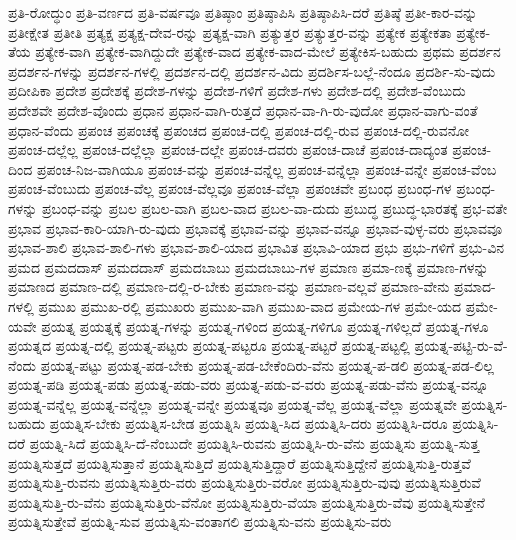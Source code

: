 {ಪ್ರತಿ-ರೋದ್ಧುಂ
ಪ್ರತಿ-ವರ್ಣದ
ಪ್ರತಿ-ವರ್ಷವೂ
ಪ್ರತಿಷ್ಠಾಂ
ಪ್ರತಿಷ್ಠಾಪಿಸಿ
ಪ್ರತಿಷ್ಠಾಪಿಸಿ-ದರೆ
ಪ್ರತಿಷ್ಠೆ
ಪ್ರತೀ-ಕಾರ-ವನ್ನು
ಪ್ರತೀಕ್ಷೇತ
ಪ್ರತೀತಿ
ಪ್ರತ್ಯಕ್ಷ
ಪ್ರತ್ಯಕ್ಷ-ದೇವ-ರನ್ನು
ಪ್ರತ್ಯಕ್ಷ-ವಾಗಿ
ಪ್ರತ್ಯುತ್ತರ
ಪ್ರತ್ಯುತ್ತರ-ವನ್ನು
ಪ್ರತ್ಯೇಕ
ಪ್ರತ್ಯೇಕತಾ
ಪ್ರತ್ಯೇಕ-ತೆಯ
ಪ್ರತ್ಯೇಕ-ವಾಗಿ
ಪ್ರತ್ಯೇಕ-ವಾಗಿದ್ದುದೇ
ಪ್ರತ್ಯೇಕ-ವಾದ
ಪ್ರತ್ಯೇಕ-ವಾದ-ಮೇಲೆ
ಪ್ರತ್ಯೇಕಿಸ-ಬಹುದು
ಪ್ರಥಮ
ಪ್ರದರ್ಶನ
ಪ್ರದರ್ಶನ-ಗಳನ್ನು
ಪ್ರದರ್ಶನ-ಗಳಲ್ಲಿ
ಪ್ರದರ್ಶನ-ದಲ್ಲಿ
ಪ್ರದರ್ಶನ-ವಿದು
ಪ್ರದರ್ಶಿಸ-ಬಲ್ಲೆ-ನೆಂದೂ
ಪ್ರದರ್ಶಿ-ಸು-ವುದು
ಪ್ರದೀಪಿಕಾ
ಪ್ರದೇಶ
ಪ್ರದೇಶಕ್ಕೆ
ಪ್ರದೇಶ-ಗಳನ್ನು
ಪ್ರದೇಶ-ಗಳಿಗೆ
ಪ್ರದೇಶ-ಗಳು
ಪ್ರದೇಶ-ದಲ್ಲಿ
ಪ್ರದೇಶ-ವೆಂಬುದು
ಪ್ರದೇಶವೇ
ಪ್ರದೇಶ-ವೊಂದು
ಪ್ರಧಾನ
ಪ್ರಧಾನ-ವಾಗಿ-ರುತ್ತದೆ
ಪ್ರಧಾನ-ವಾ-ಗಿ-ರು-ವುದೋ
ಪ್ರಧಾನ-ವಾಗು-ವಂತೆ
ಪ್ರಧಾನ-ವೆಂದು
ಪ್ರಪಂಚ
ಪ್ರಪಂಚಕ್ಕೆ
ಪ್ರಪಂಚದ
ಪ್ರಪಂಚ-ದಲ್ಲಿ
ಪ್ರಪಂಚ-ದಲ್ಲಿ-ರುವ
ಪ್ರಪಂಚ-ದಲ್ಲಿ-ರುವನೋ
ಪ್ರಪಂಚ-ದಲ್ಲೆಲ್ಲ
ಪ್ರಪಂಚ-ದಲ್ಲೆಲ್ಲಾ
ಪ್ರಪಂಚ-ದಲ್ಲೇ
ಪ್ರಪಂಚ-ದವರು
ಪ್ರಪಂಚ-ದಾಚೆ
ಪ್ರಪಂಚ-ದಾದ್ಯಂತ
ಪ್ರಪಂಚ-ದಿಂದ
ಪ್ರಪಂಚ-ನಿಜ-ವಾಗಿಯೂ
ಪ್ರಪಂಚ-ವನ್ನು
ಪ್ರಪಂಚ-ವನ್ನೆಲ್ಲ
ಪ್ರಪಂಚ-ವನ್ನೆಲ್ಲಾ
ಪ್ರಪಂಚ-ವನ್ನೇ
ಪ್ರಪಂಚ-ವೆಂಬ
ಪ್ರಪಂಚ-ವೆಂಬುದು
ಪ್ರಪಂಚ-ವೆಲ್ಲ
ಪ್ರಪಂಚ-ವೆಲ್ಲವೂ
ಪ್ರಪಂಚ-ವೆಲ್ಲಾ
ಪ್ರಪಂಚವೇ
ಪ್ರಬಂಧ
ಪ್ರಬಂಧ-ಗಳ
ಪ್ರಬಂಧ-ಗಳನ್ನು
ಪ್ರಬಂಧ-ವನ್ನು
ಪ್ರಬಲ
ಪ್ರಬಲ-ವಾಗಿ
ಪ್ರಬಲ-ವಾದ
ಪ್ರಬಲ-ವಾ-ದುದು
ಪ್ರಬುದ್ಧ
ಪ್ರಬುದ್ಧ-ಭಾರತಕ್ಕೆ
ಪ್ರಭ-ವತೇ
ಪ್ರಭಾವ
ಪ್ರಭಾವ-ಕಾರಿ-ಯಾಗಿ-ರು-ವುದು
ಪ್ರಭಾವಕ್ಕೆ
ಪ್ರಭಾವ-ವನ್ನು
ಪ್ರಭಾವ-ವನ್ನೂ
ಪ್ರಭಾವ-ವುಳ್ಳ-ವರು
ಪ್ರಭಾವವೂ
ಪ್ರಭಾವ-ಶಾಲಿ
ಪ್ರಭಾವ-ಶಾಲಿ-ಗಳು
ಪ್ರಭಾವ-ಶಾಲಿ-ಯಾದ
ಪ್ರಭಾವಿತ
ಪ್ರಭಾವಿ-ಯಾದ
ಪ್ರಭು
ಪ್ರಭು-ಗಳಿಗೆ
ಪ್ರಭು-ವಿನ
ಪ್ರಮದ
ಪ್ರಮದದಾಸ್
ಪ್ರಮದದಾಸ್
ಪ್ರಮದಬಾಬು
ಪ್ರಮದಬಾಬು-ಗಳ
ಪ್ರಮಾಣ
ಪ್ರಮಾ-ಣಕ್ಕೆ
ಪ್ರಮಾಣ-ಗಳನ್ನು
ಪ್ರಮಾಣದ
ಪ್ರಮಾಣ-ದಲ್ಲಿ
ಪ್ರಮಾಣ-ದಲ್ಲಿ-ರ-ಬೇಕು
ಪ್ರಮಾಣ-ವನ್ನು
ಪ್ರಮಾಣ-ವಲ್ಲವೆ
ಪ್ರಮಾಣ-ವೇನು
ಪ್ರಮಾದ-ಗಳಲ್ಲಿ
ಪ್ರಮುಖ
ಪ್ರಮುಖ-ರಲ್ಲಿ
ಪ್ರಮುಖರು
ಪ್ರಮುಖ-ವಾಗಿ
ಪ್ರಮುಖ-ವಾದ
ಪ್ರಮೇಯ-ಗಳ
ಪ್ರಮೇ-ಯದ
ಪ್ರಮೇ-ಯವೇ
ಪ್ರಯತ್ನ
ಪ್ರಯತ್ನಕ್ಕೆ
ಪ್ರಯತ್ನ-ಗಳನ್ನು
ಪ್ರಯತ್ನ-ಗಳಿಂದ
ಪ್ರಯತ್ನ-ಗಳಿಗೂ
ಪ್ರಯತ್ನ-ಗಳಿಲ್ಲದೆ
ಪ್ರಯತ್ನ-ಗಳೂ
ಪ್ರಯತ್ನದ
ಪ್ರಯತ್ನ-ದಲ್ಲಿ
ಪ್ರಯತ್ನ-ಪಟ್ಟರು
ಪ್ರಯತ್ನ-ಪಟ್ಟರೂ
ಪ್ರಯತ್ನ-ಪಟ್ಟರೆ
ಪ್ರಯತ್ನ-ಪಟ್ಟಲ್ಲಿ
ಪ್ರಯತ್ನ-ಪಟ್ಟಿ-ರು-ವೆ-ನೆಂದು
ಪ್ರಯತ್ನ-ಪಟ್ಟು
ಪ್ರಯತ್ನ-ಪಡ-ಬೇಕು
ಪ್ರಯತ್ನ-ಪಡ-ಬೇಕೆಂದಿರು-ವೆನು
ಪ್ರಯತ್ನ-ಪ-ಡಲಿ
ಪ್ರಯತ್ನ-ಪಡ-ಲಿಲ್ಲ
ಪ್ರಯತ್ನ-ಪಡಿ
ಪ್ರಯತ್ನ-ಪಡು
ಪ್ರಯತ್ನ-ಪಡು-ವರು
ಪ್ರಯತ್ನ-ಪಡು-ವ-ವರು
ಪ್ರಯತ್ನ-ಪಡು-ವೆನು
ಪ್ರಯತ್ನ-ವನ್ನೂ
ಪ್ರಯತ್ನ-ವನ್ನೆಲ್ಲ
ಪ್ರಯತ್ನ-ವನ್ನೆಲ್ಲಾ
ಪ್ರಯತ್ನ-ವನ್ನೇ
ಪ್ರಯತ್ನವೂ
ಪ್ರಯತ್ನ-ವೆಲ್ಲ
ಪ್ರಯತ್ನ-ವೆಲ್ಲಾ
ಪ್ರಯತ್ನವೇ
ಪ್ರಯತ್ನಿಸ-ಬಹುದು
ಪ್ರಯತ್ನಿಸ-ಬೇಕು
ಪ್ರಯತ್ನಿಸ-ಬೇಡ
ಪ್ರಯತ್ನಿಸಿ
ಪ್ರಯತ್ನಿ-ಸಿದ
ಪ್ರಯತ್ನಿಸಿ-ದರು
ಪ್ರಯತ್ನಿಸಿ-ದರೂ
ಪ್ರಯತ್ನಿಸಿ-ದರೆ
ಪ್ರಯತ್ನಿ-ಸಿದೆ
ಪ್ರಯತ್ನಿಸಿ-ದೆ-ನೆಂಬುದೇ
ಪ್ರಯತ್ನಿಸಿ-ರುವನು
ಪ್ರಯತ್ನಿಸಿ-ರು-ವೆನು
ಪ್ರಯತ್ನಿಸು
ಪ್ರಯತ್ನಿ-ಸುತ್ತ
ಪ್ರಯತ್ನಿಸುತ್ತದೆ
ಪ್ರಯತ್ನಿಸುತ್ತಾನೆ
ಪ್ರಯತ್ನಿಸುತ್ತಿದೆ
ಪ್ರಯತ್ನಿಸುತ್ತಿದ್ದಾರೆ
ಪ್ರಯತ್ನಿಸುತ್ತಿದ್ದೇನೆ
ಪ್ರಯತ್ನಿಸುತ್ತಿ-ರುತ್ತವೆ
ಪ್ರಯತ್ನಿಸುತ್ತಿ-ರುವನು
ಪ್ರಯತ್ನಿಸುತ್ತಿರು-ವರು
ಪ್ರಯತ್ನಿಸುತ್ತಿರು-ವರೋ
ಪ್ರಯತ್ನಿಸುತ್ತಿರು-ವುವು
ಪ್ರಯತ್ನಿಸುತ್ತಿರುವೆ
ಪ್ರಯತ್ನಿಸುತ್ತಿ-ರು-ವೆನು
ಪ್ರಯತ್ನಿಸುತ್ತಿರು-ವೆನೋ
ಪ್ರಯತ್ನಿಸುತ್ತಿರು-ವೆಯಾ
ಪ್ರಯತ್ನಿಸುತ್ತಿರು-ವೆವು
ಪ್ರಯತ್ನಿಸುತ್ತೇನೆ
ಪ್ರಯತ್ನಿಸುತ್ತೇವೆ
ಪ್ರಯತ್ನಿ-ಸುವ
ಪ್ರಯತ್ನಿಸು-ವಂತಾಗಲಿ
ಪ್ರಯತ್ನಿಸು-ವನು
ಪ್ರಯತ್ನಿಸು-ವರು
}

